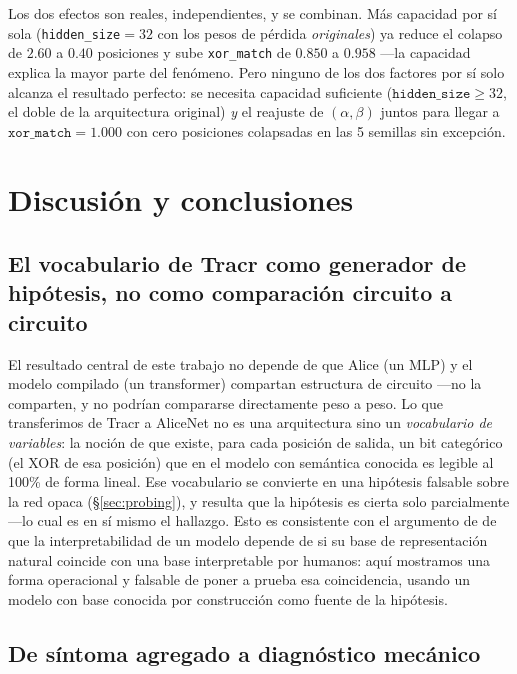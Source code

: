 \documentclass[manuscript,screen]{acmart}
\begin{document}
Los dos efectos son reales, independientes, y se combinan. Más capacidad por sí sola
(\texttt{hidden\_size}$=32$ con los pesos de pérdida \emph{originales}) ya reduce el colapso de
$2.60$ a $0.40$ posiciones y sube \texttt{xor\_match} de $0.850$ a $0.958$ —la capacidad explica
la mayor parte del fenómeno. Pero ninguno de los dos factores por sí solo alcanza el resultado
perfecto: se necesita capacidad suficiente ($\texttt{hidden\_size} \geq 32$, el doble de la
arquitectura original) \emph{y} el reajuste de $(\alpha,\beta)$ juntos para llegar a
$\texttt{xor\_match}=1.000$ con cero posiciones colapsadas en las 5 semillas sin excepción.

\section{Discusión y conclusiones}

\subsection{El vocabulario de Tracr como generador de hipótesis, no como comparación circuito a circuito}

El resultado central de este trabajo no depende de que Alice (un MLP) y el modelo compilado
(un transformer) compartan estructura de circuito —no la comparten, y no podrían compararse
directamente peso a peso. Lo que transferimos de Tracr a AliceNet no es una arquitectura sino
un \emph{vocabulario de variables}: la noción de que existe, para cada posición de salida, un
bit categórico (el XOR de esa posición) que en el modelo con semántica conocida es legible al
100\% de forma lineal. Ese vocabulario se convierte en una hipótesis falsable sobre la red
opaca (\S\ref{sec:probing}), y resulta que la hipótesis es cierta solo parcialmente —lo cual es
en sí mismo el hallazgo. Esto es consistente con el argumento de \citet{olah2022mechanistic}
de que la interpretabilidad de un modelo depende de si su base de representación natural
coincide con una base interpretable por humanos: aquí mostramos una forma operacional y
falsable de poner a prueba esa coincidencia, usando un modelo con base conocida por
construcción como fuente de la hipótesis.

\subsection{De síntoma agregado a diagnóstico mecánico}
\end{document}
